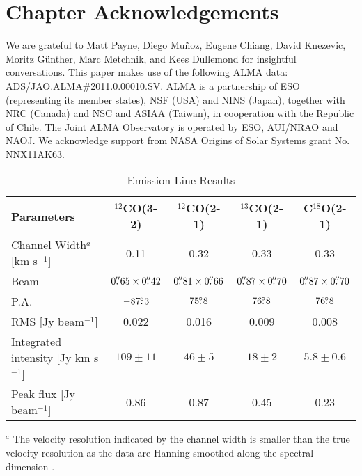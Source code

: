 \section*{Chapter Acknowledgements}
We are grateful to Matt Payne, Diego Mu{\~n}oz, Eugene Chiang, David Knezevic, 
Moritz G{\"u}nther, Marc Metchnik, and Kees Dullemond for insightful 
conversations.  This paper makes use of the following ALMA data: 
ADS/JAO.ALMA\#2011.0.00010.SV.  ALMA is a partnership 
of ESO (representing its member states), NSF (USA) and NINS (Japan), together 
with NRC (Canada) and NSC and ASIAA (Taiwan), in cooperation with the Republic 
of Chile.   The Joint ALMA Observatory is operated by ESO, AUI/NRAO and NAOJ.  
We acknowledge support from NASA Origins of Solar Systems grant No. NNX11AK63.

\clearpage

\begin{table}
\begin{center}
\centering
\caption{Emission Line Results \label{tab:lines}}\medskip
\centering
\begin{threeparttable}
  \renewcommand\TPTminimum{\linewidth} %
\centering
\begin{tabular}{lcccc}
\toprule
Parameters & $^{12}$CO(3-2) & $^{12}$CO(2-1) & $^{13}$CO(2-1) & C$^{18}$O(2-1) \\
\midrule
Channel Width$^a$ [km s$^{-1}$] & 0.11 & 0.32 & 0.33 & 0.33 \\
Beam & $0\mbox{$.\!\!^{\prime\prime}$}65\times0\mbox{$.\!\!^{\prime\prime}$}42$ & $0\mbox{$.\!\!^{\prime\prime}$}81\times0\mbox{$.\!\!^{\prime\prime}$}66$ & $0\mbox{$.\!\!^{\prime\prime}$}87\times0\mbox{$.\!\!^{\prime\prime}$}70$ & $0\mbox{$.\!\!^{\prime\prime}$}87\times0\mbox{$.\!\!^{\prime\prime}$}70$ \\
P.A. & $-87\mbox{$.\!\!^\circ$}3$ & $75\mbox{$.\!\!^\circ$}8$ & $76\mbox{$.\!\!^\circ$}8$ & $76\mbox{$.\!\!^\circ$}8$\\
RMS [Jy beam$^{-1}$] & 0.022 & 0.016 & 0.009 & 0.008 \\
Integrated intensity [Jy km s$^{-1}$] & $109\pm11$ & $46\pm5$ & $18\pm2$ & $5.8\pm 0.6$\\
Peak flux [Jy beam$^{-1}$]& 0.86 & 0.87 & 0.45 & 0.23 \\
\bottomrule
\end{tabular}
\begin{tablenotes}
\item[$^a$]{The velocity resolution indicated by the channel width 
is smaller than the true velocity resolution as the data are Hanning 
smoothed along the spectral dimension \citep{lundgren12}.}
\end{tablenotes}
\end{threeparttable}
\end{center}
\end{table}

